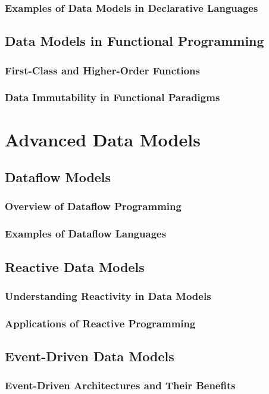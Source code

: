 \documentclass[12pt, oneside]{book}
\begin{document}
\subsubsection{Examples of Data Models in Declarative Languages}
\subsection{Data Models in Functional Programming}
\subsubsection{First-Class and Higher-Order Functions}
\subsubsection{Data Immutability in Functional Paradigms}
\section{Advanced Data Models}
\subsection{Dataflow Models}
\subsubsection{Overview of Dataflow Programming}
\subsubsection{Examples of Dataflow Languages}
\subsection{Reactive Data Models}
\subsubsection{Understanding Reactivity in Data Models}
\subsubsection{Applications of Reactive Programming}
\subsection{Event-Driven Data Models}
\subsubsection{Event-Driven Architectures and Their Benefits}
\end{document}
